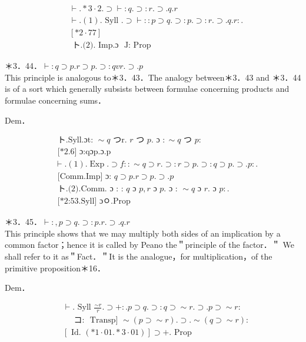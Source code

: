 \documentclass[10pt]{article}
\begin{document}
\begin{align*}
& \vdash . * 3 \cdot 2 . \supset \vdash: q . \supset: r . \supset . q . r  \tag{1}\\
& \vdash .(1) . \text { Syll } . \supset \vdash:: p \supset q . \supset: p . \supset: r . \supset . q . r: . \\
& {[* 2 \cdot 77]}  \tag{2}\\
& \text { ト.(2). Imp.ɔ } \text { J: Prop }
\end{align*}


＊3．44．$\vdash: q \supset p . r \supset p . \supset: q v r . \supset . p$\\
This principle is analogous to＊3．43．The analogy between＊3．43 and ＊3．44 is of a sort which generally subsists between formulae concerning products and formulae concerning sums．

Dem．


\begin{align*}
& \text { ト.Syll.ɔt: } \sim q \text { つr. } r \text { つ } p . \text { ɔ }: \sim q \text { つ } p: \\
& \text { [*2.6] ɔ:qɔp.ɔ.p }  \tag{1}\\
& \vdash .(1) . \operatorname{Exp} . \supset f:: \sim q \supset r . \supset: r \supset p . \supset: q \supset p . \supset . p: . \\
& \text { [Comm.Imp] ɔ: } q \supset p . r \supset p . \supset . p  \tag{2}\\
& \text { ト.(2).Comm. ɔ : : } q \text { ɔ } p, r \text { ɔ } p . \text { ɔ : } \sim q \text { ɔ } r . \text { ɔ } p: . \\
& \text { [*2:53.Syll] ɔㅇ.Prop }
\end{align*}


＊3．45．$\vdash:, p \supset q . \supset: p . r . \supset . q . r$\\
This principle shows that we may multiply both sides of an implication by a common factor；hence it is called by Peano the＂principle of the factor．＂ We shall refer to it as＂Fact．＂It is the analogue，for multiplication，of the primitive proposition＊16．

Dem．

$$
\begin{aligned}
& \vdash . \text { Syll } \frac{\sim r}{r} . \supset+: . p \supset q . \supset: q \supset \sim r . \supset . p \supset \sim r: \\
& \quad \text { コ: } \text { Transp] } \sim(p \supset \sim r) . \supset . \sim(q \supset \sim r): \\
& {[\text { Id. }(* 1 \cdot 01 . * 3 \cdot 01)] \supset+. \text { Prop }}
\end{aligned}
$$
\end{document}

